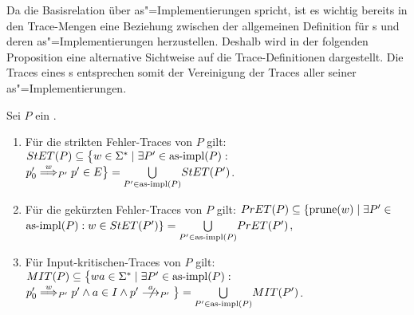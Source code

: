 Da die Basisrelation über as"=Implementierungen spricht, ist es wichtig bereits
in den Trace-Mengen eine Beziehung zwischen der allgemeinen Definition für
\MEIO{}s und deren as"=Implementierungen herzustellen. Deshalb wird in der
folgenden Proposition eine alternative Sichtweise auf die Trace-Definitionen
dargestellt. Die Traces eines \MEIO{}s entsprechen somit der Vereinigung der
Traces aller seiner as"=Implementierungen.

\begin{Prop}
  \label{KommTracesProp}
  Sei $P$ ein \MEIO{}.
  \begin{enumerate}
    \item Für die strikten Fehler-Traces von $P$ gilt: $StET (P) \subseteq
      \big\{w\in\Sigma ^* \mid \exists P' \in\mathrm{as}\text{-}\mathrm{impl} (P) :$ $p'_0
      \weakmust[w]_{P'} p' \in E\big\} = \underset{P' \in\asimp (P)}{\bigcup}
      \StET (P')$.
    \item Für die gekürzten Fehler-Traces von $P$ gilt: $PrET (P) \subseteq
      \{\mathrm{prune} (w) \mid \exists P' \in$\linebreak $\mathrm{as}\text{-}\mathrm{impl} (P) : w\in StET (P')
      \} = \underset{P' \in\mathrm{as}\text{-}\mathrm{impl} (P)}{\bigcup} PrET (P')$,
    \item Für Input-kritischen-Traces von $P$ gilt: $MIT (P) \subseteq
      \big\{wa\in\Sigma ^* \mid \exists P' \in\mathrm{as}\text{-}\mathrm{impl} (P) :$ $p'_0
      \weakmust[w]_{P'} p' \land a\in I\land p'\nmust[a]_{P'} \big\} =
      \underset{P' \in\asimp (P)}{\bigcup} \MIT (P')$.
  \end{enumerate}
\end{Prop}

